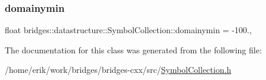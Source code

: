 \subsubsection{\texorpdfstring{domainymin}{domainymin}}
{\footnotesize\ttfamily float bridges\+::datastructure\+::\+Symbol\+Collection\+::domainymin = -\/100.\hspace{0.3cm}{\ttfamily [mutable]}, {\ttfamily [protected]}}



The documentation for this class was generated from the following file\+:\begin{DoxyCompactItemize}
\item 
/home/erik/work/bridges/bridges-\/cxx/src/\hyperlink{_symbol_collection_8h}{Symbol\+Collection.\+h}\end{DoxyCompactItemize}
